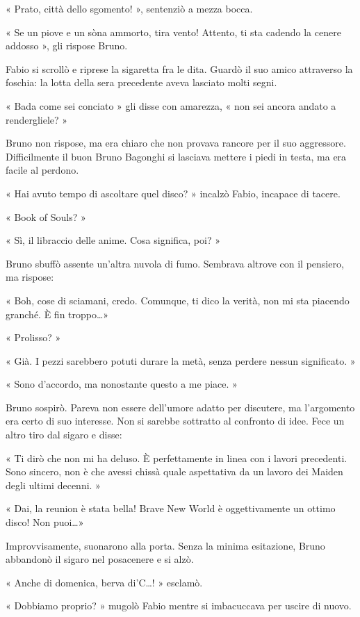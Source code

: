« Prato, città dello sgomento! », sentenziò a mezza bocca.

« Se \textsc{}un piove e \textsc{}un sòna ammorto, tira vento! Attento, ti sta cadendo la cenere addosso », gli rispose Bruno.

Fabio si scrollò e riprese la sigaretta fra le dita. Guardò il suo amico attraverso la foschia: la lotta della sera precedente aveva lasciato molti segni.

« Bada come sei conciato » gli disse con amarezza, « non sei ancora andato a rendergliele? »

Bruno non rispose, ma era chiaro che non provava rancore per il suo aggressore. Difficilmente il buon Bruno Bagonghi si lasciava mettere i piedi in testa, ma era facile al perdono.

« Hai avuto tempo di ascoltare quel disco? » incalzò Fabio, incapace di tacere.

« Book of Souls? »

« Sì, il libraccio delle anime. Cosa significa, poi? »

Bruno sbuffò assente un'altra nuvola di fumo. Sembrava altrove con il pensiero, ma rispose:

« Boh, cose di sciamani, credo. Comunque, ti dico la verità, non mi sta piacendo granché. È fin troppo\ldots »

« Prolisso? »

« Già. I pezzi sarebbero potuti durare la metà, senza perdere nessun significato. »

« Sono d'accordo, ma nonostante questo a me piace. »

Bruno sospirò. Pareva non essere dell'umore adatto per discutere, ma l'argomento era certo di suo interesse. Non si sarebbe sottratto al confronto di idee. Fece un altro tiro dal sigaro e disse:

« Ti dirò che non mi ha deluso. È perfettamente in linea con i lavori precedenti. Sono sincero, non è che avessi chissà quale aspettativa da un lavoro dei Maiden degli ultimi decenni. »

« Dai, la reunion è stata bella! Brave New World è oggettivamente un ottimo disco! Non puoi\ldots »

Improvvisamente, suonarono alla porta. Senza la minima esitazione, Bruno abbandonò il sigaro nel posacenere e si alzò.

« Anche di domenica, berva di'C\ldots! » esclamò.

« Dobbiamo proprio? » mugolò Fabio mentre si imbacuccava per uscire di nuovo.

